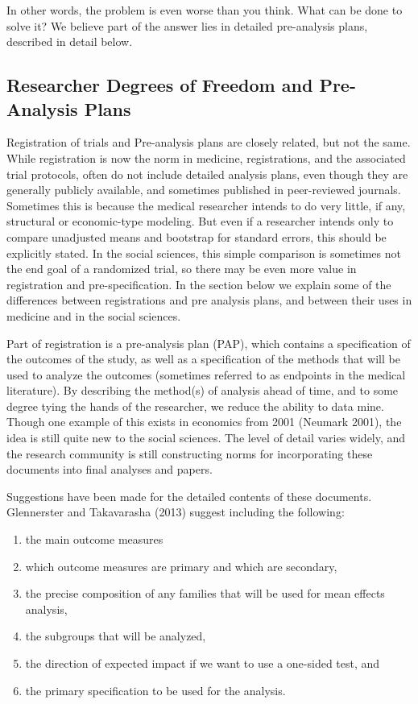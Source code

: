 \documentclass[12pt] {article}
\begin{document}
In other words, the problem is even worse than you think. What can be
done to solve it? We believe part of the answer lies in detailed
pre-analysis plans, described in detail below.

\subsection{Researcher Degrees of Freedom and Pre-Analysis
Plans}\label{researcher-degrees-of-freedom-and-pre-analysis-plans}

Registration of trials and Pre-analysis plans are closely related, but
not the same. While registration is now the norm in medicine,
registrations, and the associated trial protocols, often do not include
detailed analysis plans, even though they are generally publicly
available, and sometimes published in peer-reviewed journals. Sometimes
this is because the medical researcher intends to do very little, if
any, structural or economic-type modeling. But even if a researcher
intends only to compare unadjusted means and bootstrap for standard
errors, this should be explicitly stated. In the social sciences, this
simple comparison is sometimes not the end goal of a randomized trial,
so there may be even more value in registration and pre-specification.
In the section below we explain some of the differences between
registrations and pre analysis plans, and between their uses in medicine
and in the social sciences.

Part of registration is a pre-analysis plan (PAP), which contains a
specification of the outcomes of the study, as well as a specification
of the methods that will be used to analyze the outcomes (sometimes
referred to as endpoints in the medical literature). By describing the
method(s) of analysis ahead of time, and to some degree tying the hands
of the researcher, we reduce the ability to data mine. Though one
example of this exists in economics from 2001 (Neumark 2001), the idea
is still quite new to the social sciences. The level of detail varies
widely, and the research community is still constructing norms for
incorporating these documents into final analyses and papers.

Suggestions have been made for the detailed contents of these documents.
Glennerster and Takavarasha (2013) suggest including the following:

\begin{enumerate}
\def\labelenumi{\arabic{enumi}.}
\item
  the main outcome measures
\item
  which outcome measures are primary and which are secondary,
\item
  the precise composition of any families that will be used for mean
  effects analysis,
\item
  the subgroups that will be analyzed,
\item
  the direction of expected impact if we want to use a one-sided test,
  and
\item
  the primary specification to be used for the analysis.
\end{enumerate}
\end{document}
